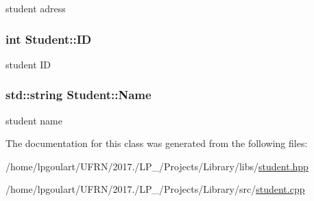 student adress 

\subsubsection[{\texorpdfstring{ID}{ID}}]{\setlength{\rightskip}{0pt plus 5cm}int Student\+::\+ID\hspace{0.3cm}{\ttfamily [private]}}\hypertarget{classStudent_abb8d0bd3565b4c8ce2b37247542283b5}{}\label{classStudent_abb8d0bd3565b4c8ce2b37247542283b5}


student ID 

\subsubsection[{\texorpdfstring{Name}{Name}}]{\setlength{\rightskip}{0pt plus 5cm}std\+::string Student\+::\+Name\hspace{0.3cm}{\ttfamily [private]}}\hypertarget{classStudent_a914e02c29156e1a3b1b51cad6bbc9083}{}\label{classStudent_a914e02c29156e1a3b1b51cad6bbc9083}


student name 



The documentation for this class was generated from the following files\+:\begin{DoxyCompactItemize}
\item 
/home/lpgoulart/\+U\+F\+R\+N/2017./\+L\+P\+\_/\+Projects/\+Library/libs/\hyperlink{student_8hpp}{student.\+hpp}\item 
/home/lpgoulart/\+U\+F\+R\+N/2017./\+L\+P\+\_/\+Projects/\+Library/src/\hyperlink{student_8cpp}{student.\+cpp}\end{DoxyCompactItemize}
